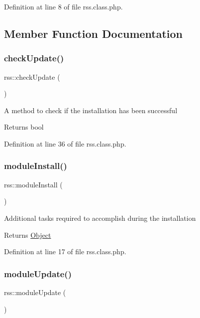 Definition at line 8 of file rss.\+class.\+php.



\subsection{Member Function Documentation}
\hypertarget{classrss_abea52ff499087ead7116c986080a685a}{}\label{classrss_abea52ff499087ead7116c986080a685a} 
\subsubsection{\texorpdfstring{check\+Update()}{checkUpdate()}}
{\footnotesize\ttfamily rss\+::check\+Update (\begin{DoxyParamCaption}{ }\end{DoxyParamCaption})}

A method to check if the installation has been successful \begin{DoxyReturn}{Returns}
bool 
\end{DoxyReturn}


Definition at line 36 of file rss.\+class.\+php.

\hypertarget{classrss_a6730f54dbfe8b8d31066f3658f02185b}{}\label{classrss_a6730f54dbfe8b8d31066f3658f02185b} 
\subsubsection{\texorpdfstring{module\+Install()}{moduleInstall()}}
{\footnotesize\ttfamily rss\+::module\+Install (\begin{DoxyParamCaption}{ }\end{DoxyParamCaption})}

Additional tasks required to accomplish during the installation

\begin{DoxyReturn}{Returns}
\hyperlink{classObject}{Object} 
\end{DoxyReturn}


Definition at line 17 of file rss.\+class.\+php.

\hypertarget{classrss_a68d8a7c97f3afd095c5ed5c1a304e8e5}{}\label{classrss_a68d8a7c97f3afd095c5ed5c1a304e8e5} 
\subsubsection{\texorpdfstring{module\+Update()}{moduleUpdate()}}
{\footnotesize\ttfamily rss\+::module\+Update (\begin{DoxyParamCaption}{ }\end{DoxyParamCaption})}

